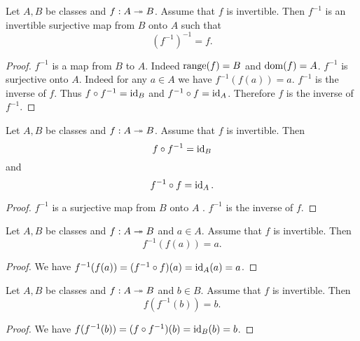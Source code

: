 \documentclass[../../set-theory/set-theory.tex]{subfiles}
\begin{document}
  \begin{forthel}
    \begin{proposition}
      Let $A, B$ be classes and $f : A \twoheadrightarrow B$.
      Assume that $f$ is invertible.
      Then $f^{-1}$ is an invertible surjective map from $B$ onto $A$ such that
      \[ (f^{-1})^{-1} = f. \]
    \end{proposition}
    \begin{proof}
      $f^{-1}$ is a map from $B$ to $A$.
      Indeed $\operatorname{range}(f) = B$ and $\operatorname{dom}(f) = A$.
      $f^{-1}$ is surjective onto $A$.
      Indeed for any $a \in A$ we have $f^{-1}(f(a)) = a$.
      $f^{-1}$ is the inverse of $f$.
      Thus $f \circ f^{-1} = \operatorname{id}_{B}$ and $f^{-1} \circ f = \operatorname{id}_{A}$.
      Therefore $f$ is the inverse of $f^{-1}$.
    \end{proof}
  \end{forthel}

  \begin{forthel}
    \begin{proposition}
      Let $A, B$ be classes and $f : A \twoheadrightarrow B$.
      Assume that $f$ is invertible.
      Then \[ f \circ f^{-1} = \operatorname{id}_{B} \] and \[ f^{-1} \circ f = \operatorname{id}_{A}. \]
    \end{proposition}
    \begin{proof}
      $f^{-1}$ is a surjective map from $B$ onto $A$ .
      $f^{-1}$ is the inverse of $f$.
    \end{proof}
  \end{forthel}

  \begin{forthel}
    \begin{proposition}
      Let $A, B$ be classes and $f : A \twoheadrightarrow B$ and $a \in A$.
      Assume that $f$ is invertible.
      Then \[ f^{-1}(f(a)) = a. \]
    \end{proposition}
    \begin{proof}
      We have $f^{-1}(f(a)) = (f^{-1} \circ f)(a) = \operatorname{id}_{A}(a) = a$.
    \end{proof}

    \begin{proposition}
      Let $A, B$ be classes and $f : A \twoheadrightarrow B$ and $b \in B$.
      Assume that $f$ is invertible.
      Then \[ f(f^{-1}(b)) = b. \]
    \end{proposition}
    \begin{proof}
      We have
      $f(f^{-1}(b))
        = (f \circ f^{-1})(b)
        = \operatorname{id}_{B}(b)
        = b$.
    \end{proof}
  \end{forthel}
\end{document}
